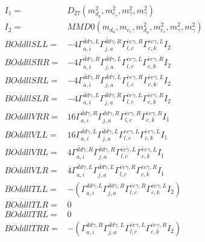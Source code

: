 \documentclass[A4,landscape]{article}
\begin{document}
\begin{align} 
I_1 = & D_{27}(m^2_{d_{{a}}}, m^2_{e_{{c}}}, m^2_{\gamma}, m^2_{\gamma}) \\ 
I_2 = & MMD0(m_{d_{{a}}}, m_{e_{{c}}}, m^2_{d_{{a}}}, m^2_{e_{{c}}}, m^2_{\gamma}, m^2_{\gamma}) \\ 
  BOddllSLL= & -4  \Gamma^{\bar{d}d \gamma ,L}_{a, i} \Gamma^{\bar{d}d \gamma ,R}_{j, a} \Gamma^{\bar{e}e \gamma ,R}_{l, c} \Gamma^{\bar{e}e \gamma ,L}_{c, k} I_2 \\ 
  BOddllSRR= & -4  \Gamma^{\bar{d}d \gamma ,R}_{a, i} \Gamma^{\bar{d}d \gamma ,L}_{j, a} \Gamma^{\bar{e}e \gamma ,L}_{l, c} \Gamma^{\bar{e}e \gamma ,R}_{c, k} I_2 \\ 
  BOddllSRL= & -4  \Gamma^{\bar{d}d \gamma ,R}_{a, i} \Gamma^{\bar{d}d \gamma ,L}_{j, a} \Gamma^{\bar{e}e \gamma ,R}_{l, c} \Gamma^{\bar{e}e \gamma ,L}_{c, k} I_2 \\ 
  BOddllSLR= & -4  \Gamma^{\bar{d}d \gamma ,L}_{a, i} \Gamma^{\bar{d}d \gamma ,R}_{j, a} \Gamma^{\bar{e}e \gamma ,L}_{l, c} \Gamma^{\bar{e}e \gamma ,R}_{c, k} I_2 \\ 
  BOddllVRR= & 16  \Gamma^{\bar{d}d \gamma ,R}_{a, i} \Gamma^{\bar{d}d \gamma ,R}_{j, a} \Gamma^{\bar{e}e \gamma ,R}_{l, c} \Gamma^{\bar{e}e \gamma ,R}_{c, k} I_1 \\ 
  BOddllVLL= & 16  \Gamma^{\bar{d}d \gamma ,L}_{a, i} \Gamma^{\bar{d}d \gamma ,L}_{j, a} \Gamma^{\bar{e}e \gamma ,L}_{l, c} \Gamma^{\bar{e}e \gamma ,L}_{c, k} I_1 \\ 
  BOddllVRL= & 4  \Gamma^{\bar{d}d \gamma ,R}_{a, i} \Gamma^{\bar{d}d \gamma ,R}_{j, a} \Gamma^{\bar{e}e \gamma ,L}_{l, c} \Gamma^{\bar{e}e \gamma ,L}_{c, k} I_1 \\ 
  BOddllVLR= & 4  \Gamma^{\bar{d}d \gamma ,L}_{a, i} \Gamma^{\bar{d}d \gamma ,L}_{j, a} \Gamma^{\bar{e}e \gamma ,R}_{l, c} \Gamma^{\bar{e}e \gamma ,R}_{c, k} I_1 \\ 
  BOddllTLL= & -( \Gamma^{\bar{d}d \gamma ,L}_{a, i} \Gamma^{\bar{d}d \gamma ,R}_{j, a} \Gamma^{\bar{e}e \gamma ,R}_{l, c} \Gamma^{\bar{e}e \gamma ,L}_{c, k} I_2) \\ 
  BOddllTLR= & 0 \\ 
  BOddllTRL= & 0 \\ 
  BOddllTRR= & -( \Gamma^{\bar{d}d \gamma ,R}_{a, i} \Gamma^{\bar{d}d \gamma ,L}_{j, a} \Gamma^{\bar{e}e \gamma ,L}_{l, c} \Gamma^{\bar{e}e \gamma ,R}_{c, k} I_2) \\ 
\end{align} 
\end{document}
